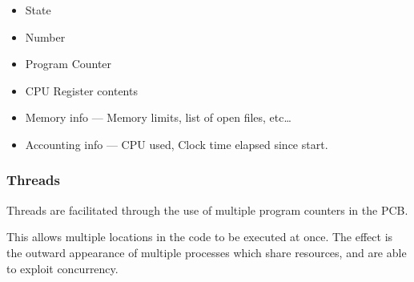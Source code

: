\begin{itemize}
    \item State
    \item Number
    \item Program Counter
    \item CPU Register contents
    \item Memory info --- Memory limits, list of open files, etc\ldots
    \item Accounting info --- CPU used, Clock time elapsed since start.
\end{itemize}


\subsubsection{Threads}

Threads are facilitated through the use of multiple program counters in the PCB.

This allows multiple locations in the code to be executed at once.
The effect is the outward appearance of multiple processes which share
resources, and are able to exploit concurrency.